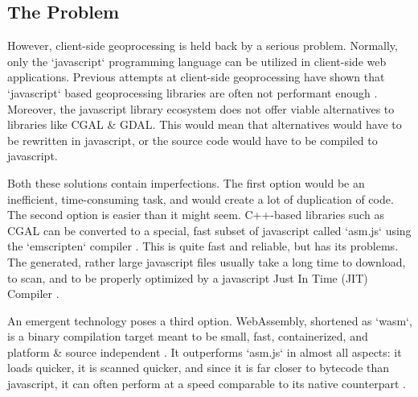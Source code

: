 \subsection*{The Problem}


However, client-side geoprocessing is held back by a serious problem.
Normally, only the `javascript` programming language can be utilized in client-side web applications. Previous attempts at client-side geoprocessing have shown that `javascript` based geoprocessing libraries are often not performant enough \cite{hamilton_client-side_2014}. 
Moreover, the javascript library ecosystem does not offer viable alternatives to libraries like CGAL \& GDAL. 
This would mean that alternatives would have to be rewritten in javascript, or the source code would have to be compiled to javascript. 


Both these solutions contain imperfections. The first option would be an inefficient, time-consuming task, and would create a lot of duplication of code. 
The second option is easier than it might seem. C++-based libraries such as CGAL can be converted to a special, fast subset of javascript called `asm.js` using the `emscripten` compiler \cite{zakai_emscripten_2011}. 
This is quite fast and reliable, but has its problems. 
The generated, rather large javascript files usually take a long time to download, to scan, and to be properly optimized by a javascript Just In Time (JIT) Compiler \cite{haas_bringing_2017}. 

An emergent technology poses a third option. WebAssembly, shortened as `wasm`, is a binary compilation target meant to be small, fast, containerized, and platform \& source independent \cite{haas_bringing_2017}. It outperforms `asm.js` in almost all aspects: it loads quicker, it is scanned quicker, and since it is far closer to bytecode than javascript, it can often perform at a speed comparable to its native counterpart \cite{jangda_not_2019}. 

\cite{beilschmidt_vat_2017}



